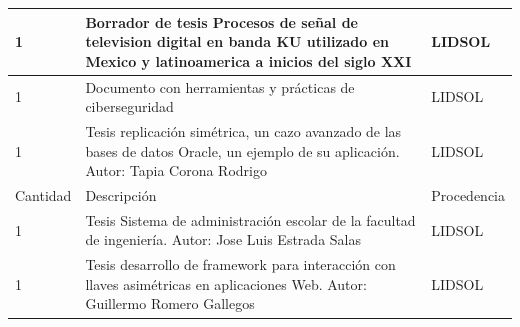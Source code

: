 \documentclass[a4paper,11pt]{article}                 %
\begin{document}
\begin{longtable}{|p{}|p{}|p{}|}
1        & Borrador de tesis Procesos de señal de television digital en banda KU utilizado en Mexico y latinoamerica a inicios del siglo XXI                      & LIDSOL      \\ \hline
1        & Documento con herramientas y prácticas de ciberseguridad                                                                                               & LIDSOL      \\ \hline
1        & Tesis replicación simétrica, un cazo avanzado de las bases de datos Oracle, un ejemplo de su aplicación. Autor: Tapia Corona Rodrigo                   & LIDSOL      \\ \hline
\newpage
\hline
Cantidad & Descripción                                                                                                                                               & Procedencia \\ \hline
1        & Tesis Sistema de administración escolar de la facultad de ingeniería. Autor: Jose Luis Estrada Salas                                                   & LIDSOL      \\ \hline
1        & Tesis desarrollo de framework para interacción con llaves asimétricas en aplicaciones Web. Autor: Guillermo Romero Gallegos                            & LIDSOL      \\ \hline

\end{longtable}


    
\end{document}
